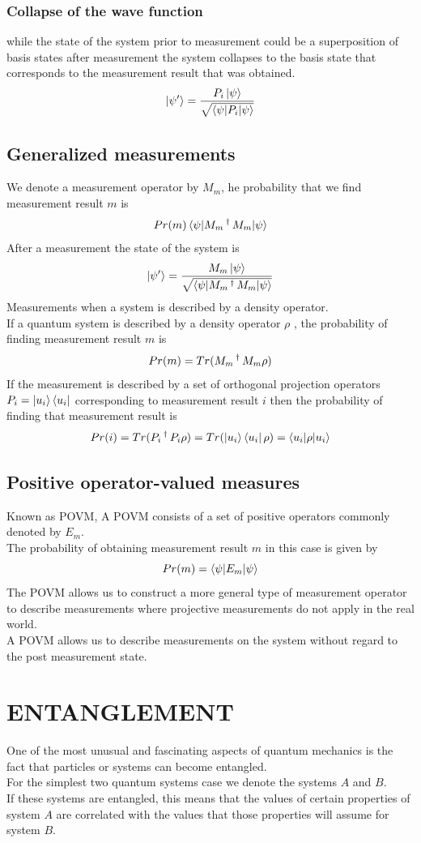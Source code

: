 \documentclass[12pt,oneside]{book}
\begin{document}
\subsection{Collapse of the wave function}
while the state of the system prior to measurement could be a superposition of basis states after measurement the system collapses to the basis state that corresponds to the measurement result that was obtained.
\[ \ket{\psi'} = \frac{P_i\ket{\psi}}{\sqrt{ \braket{\psi|P_i|\psi}}} \]
\section{Generalized measurements}
    We denote a measurement operator by $M_m$, he probability that we find measurement result $m$ is
    \[ Pr(m) \braket{ \psi|M_m\operatorname{^\dagger} M_m|\psi } \]
    After a measurement the state of the system is 
    \[ \ket{\psi'} = \frac{M_m\ket{\psi}}{\sqrt{\braket{\psi|M_m\operatorname{^\dagger} M_m|\psi}}} \]
    Measurements when a system is described by a density operator.\\
    If a quantum system is described by a density operator $\rho$ , the probability of finding measurement result $m$ is 
    \[ Pr(m) = Tr(M_m\operatorname{^\dagger} M_m \rho) \]
    If the measurement is described by a set of orthogonal projection operators $P_i = \ket{u_i}\bra{u_i}$ corresponding to measurement result $i$ then the probability of finding that measurement result is
    \[ Pr(i) = Tr(P_i\operatorname{^\dagger} P_i \rho) = Tr(\ket{u_i}\bra{u_i}\rho) = \braket{u_i|\rho|u_i} \]

\section{Positive operator-valued measures}
Known as POVM, A POVM consists of a set of positive operators commonly denoted by $E_m$.\\
The probability of obtaining measurement result $m$ in this case is given by
\[Pr(m) = \braket{\psi|E_m|\psi}\]
The POVM allows us to construct a more general type of measurement operator to describe measurements where projective measurements do not apply in the real world.\\
A POVM  allows us to describe measurements on the system without regard to the post measurement state.

\chapter{ENTANGLEMENT}
One of the most unusual and fascinating aspects of quantum mechanics is the fact that particles or systems can become entangled.\\
For the simplest two quantum systems case we denote the systems $A$ and $B$.\\
If these systems are entangled, this means that the values of certain properties of system $A$ are correlated with the values that those properties will assume for system $B$.
\end{document}
